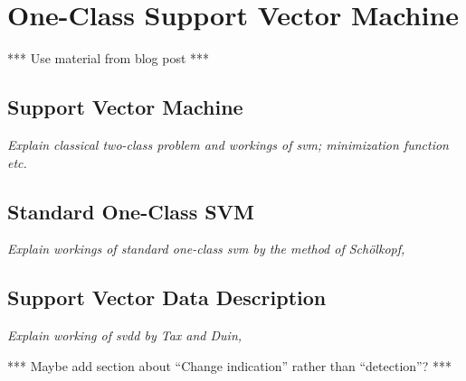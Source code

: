 \section{One-Class Support Vector Machine}\label{sec:one_class_svm}
*** Use material from blog post ***
\subsection{Support Vector Machine}
\emph{Explain classical two-class problem and workings of \gls{svm}; minimization function etc.}

\subsection{Standard One-Class SVM}
\emph{Explain workings of standard one-class svm by the method of Sch\"olkopf, \cite{scholkopf1999support}}

\subsection{Support Vector Data Description}
\emph{Explain working of \gls{svdd} by Tax and Duin, \cite{tax2004support}}

*** Maybe add section about ``Change indication'' rather than ``detection''? ***